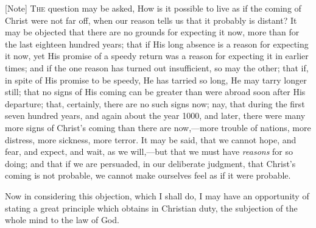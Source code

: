 [Note] T\textsc{he} question may be asked,
How is it possible to live as if the coming of Christ were not far
off, when our reason tells us that it probably is distant? It may be
objected that there are no grounds for expecting it now, more than for
the last eighteen hundred years; that if His long absence is a reason
for expecting it now, yet His promise of a speedy return was a reason
for expecting it in earlier times; and if the one reason has turned
out insufficient, so may the other; that if, in spite of His promise
to be speedy, He has tarried so long, He may tarry longer still; that
no signs of His coming can be greater than were abroad soon after His
departure; that, certainly, there are no such signs now; nay, that
during the first seven hundred years, and again about the year 1000,
and later, there were many more signs of Christ's coming than there
are now,—more trouble of nations, more distress, more sickness, more
terror. It may be said, that we cannot hope, and fear, and expect, and
wait, as we will,—but that we must have \emph{reasons} for so doing;
and that if we are persuaded, in our deliberate judgment, that
Christ's coming is not probable, we cannot make ourselves feel as if
it were probable.

Now in considering this objection, which I shall do, I may have an
opportunity of stating a great principle which obtains in Christian
duty, the subjection of the whole mind to the law of God.


